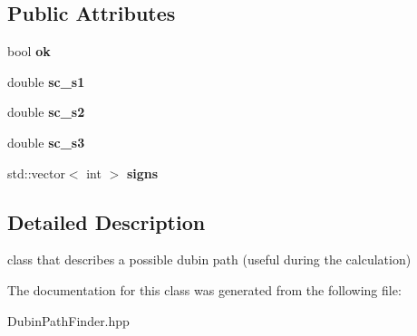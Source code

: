 \subsection*{Public Attributes}
\begin{DoxyCompactItemize}
\item 
\mbox{\label{class_dubin_path_finder_1_1_possible_dubin_path_aa03f7a235d4d8db22a44d754a624e7f5}} 
bool {\bfseries ok}
\item 
\mbox{\label{class_dubin_path_finder_1_1_possible_dubin_path_a3dfa9d34892f65aac80bbc03848bdaf9}} 
double {\bfseries sc\+\_\+s1}
\item 
\mbox{\label{class_dubin_path_finder_1_1_possible_dubin_path_a4cf9fb028159809c3a3d408d4517b193}} 
double {\bfseries sc\+\_\+s2}
\item 
\mbox{\label{class_dubin_path_finder_1_1_possible_dubin_path_a55f848881ff2378e0bd5dc16b69ad009}} 
double {\bfseries sc\+\_\+s3}
\item 
\mbox{\label{class_dubin_path_finder_1_1_possible_dubin_path_a22e0869994b7d652dcf868ef919b5054}} 
std\+::vector$<$ int $>$ {\bfseries signs}
\end{DoxyCompactItemize}


\subsection{Detailed Description}
class that describes a possible dubin path (useful during the calculation) 

The documentation for this class was generated from the following file\+:\begin{DoxyCompactItemize}
\item 
Dubin\+Path\+Finder.\+hpp\end{DoxyCompactItemize}
